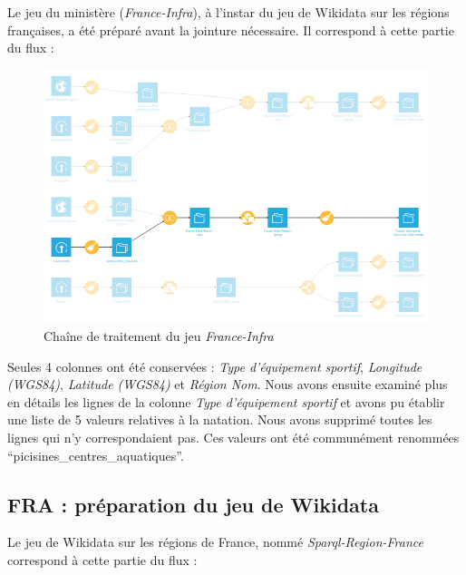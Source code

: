 \documentclass[hidelinks, 12pt]{report}
\begin{document}
Le jeu du ministère (\textit{France-Infra}), à l'instar du jeu de Wikidata sur les régions françaises, a été préparé avant la jointure nécessaire. Il correspond à cette partie du flux :

\begin{center}
	\begin{figure}[H]
		\setlength{\belowcaptionskip}{-35pt}
		\includegraphics[scale=0.55]{images/flow-swim-fra-ministere.png}
		\caption{Chaîne de traitement du jeu \textit{France-Infra}}
	\end{figure}
\end{center}

Seules 4 colonnes ont été conservées : \textit{Type d'équipement sportif}, \textit{Longitude (WGS84)}, \textit{Latitude (WGS84)} et \textit{Région Nom}. Nous avons ensuite examiné plus en détails les lignes de la colonne \textit{Type d'équipement sportif} et avons pu établir une liste de 5 valeurs relatives à la natation. Nous avons supprimé toutes les lignes qui n'y correspondaient pas. Ces valeurs ont été communément renommées \enquote{picisines\_centres\_aquatiques}.





%





\subsection{FRA : préparation du jeu de Wikidata}

Le jeu de Wikidata sur les régions de France, nommé \textit{Sparql-Region-France} correspond à cette partie du flux :
\end{document}
